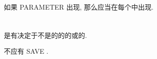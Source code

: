 如果 PARAMETER \Keyword{}出现, 那么\tit{\Initialization{}}应当在每个\tit{\Entity{}\Declaration{}}中出现.

\section{\Automatic{}\Data{}\Object{}}

\Automatic{}\Data{}\Object{}是有决定于不是\Constant{}\Expression{}的\tit{\Specification{}\Expression{}}的\Value{}的\TypeParameter{}或\Array{}\Bound{}的\Nondummy{}\Data{}\Object{}.

\Automatic{}\Data{}\Object{}不应有 SAVE \Attribute{}.
